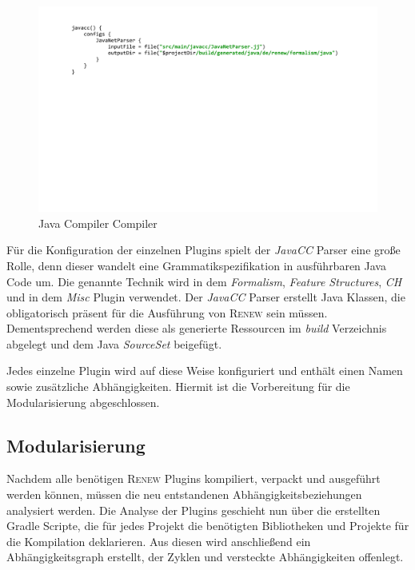 	\begin{figure}[h!]
	  \centering
	  \includegraphics[width=\textwidth]{material/images/gradle/javacc.pdf}
	  \caption{Java Compiler Compiler}
	  \label{fig:javacc}
	\end{figure}

	Für die Konfiguration der einzelnen Plugins spielt der \textit{JavaCC} Parser eine große Rolle, denn dieser wandelt eine Grammatikspezifikation in ausführbaren Java Code um. Die genannte Technik wird in dem \textit{Formalism}, \textit{Feature Structures}, \textit{CH} und in dem \textit{Misc} Plugin verwendet. Der \textit{JavaCC} Parser erstellt Java Klassen, die obligatorisch präsent für die Ausführung von \textsc{Renew} sein müssen. Dementsprechend werden diese als generierte Ressourcen im \textit{build} Verzeichnis abgelegt und dem Java \textit{SourceSet} beigefügt. \bigbreak

	Jedes einzelne Plugin wird auf diese Weise konfiguriert und enthält einen Namen sowie zusätzliche Abhängigkeiten. Hiermit ist die Vorbereitung für die Modularisierung abgeschlossen. 


\subsection{Modularisierung}	
	Nachdem alle benötigen \textsc{Renew} Plugins kompiliert, verpackt und ausgeführt werden können, müssen die neu entstandenen Abhängigkeitsbeziehungen analysiert werden. Die Analyse der Plugins geschieht nun über die erstellten Gradle Scripte, die für jedes Projekt die benötigten Bibliotheken und Projekte für die Kompilation deklarieren. Aus diesen wird anschließend ein Abhängigkeitsgraph erstellt, der Zyklen und versteckte Abhängigkeiten offenlegt. \bigbreak

